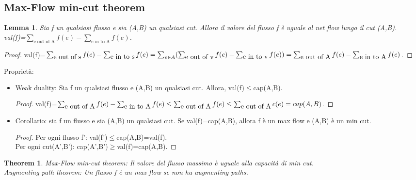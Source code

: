 \documentclass{article}
\newtheorem{theorem}{Theorem}[subsection]
\newtheorem{lemma}{Lemma}[subsection]
\begin{document}
\subsection{Max-Flow min-cut theorem}
\begin{lemma}
    Sia f un qualsiasi flusso e sia (A,B) un qualsiasi cut. Allora il valore del flusso f è uguale al net flow lungo il cut (A,B).\\
    val(f)=$\sum_{\mbox{e out of A}}f(e)-\sum_{\mbox{e in to A}}f(e)$.
\end{lemma}
\begin{proof}
    val(f)=$\sum_{\mbox{e out of s}}f(e)-\sum_{\mbox{e in to s}}f(e)\\=\sum_{v\in A}(\sum_{\mbox{e out of v}}f(e)-\sum_{\mbox{e in to v}}f(e))\\=\sum_{\mbox{e out of A}}f(e)-\sum_{\mbox{e in to A}}f(e)$.
\end{proof}
Proprietà:
\begin{itemize}
    \item Weak duality: Sia f un qualsiasi flusso e (A,B) un qualsiasi cut. Allora, val(f)$\leq$cap(A,B).
    \begin{proof}
        val(f)=$\sum_{\mbox{e out of A}}f(e)-\sum_{\mbox{e in to A}}f(e)\\\leq\sum_{\mbox{e out of A}}f(e)\\\leq\sum_{\mbox{e out of A}}c(e)=cap(A,B)$.
    \end{proof}
    \item Corollario: sia f un flusso e sia (A,B) un qualsiasi cut. Se val(f)=cap(A,B), allora f è un max flow e (A,B) è un min cut.
    \begin{proof}
        Per ogni flusso f': val(f')$\leq$cap(A,B)=val(f).\\
        Per ogni cut(A',B'): cap(A',B')$\geq$val(f)=cap(A,B).
    \end{proof}
\end{itemize}
\begin{theorem}
    Max-Flow min-cut theorem: Il valore del flusso massimo è uguale alla capacità di min cut.\\
    Augmenting path theorem: Un flusso f è un max flow se non ha augmenting paths.
\end{theorem}
\end{document}
